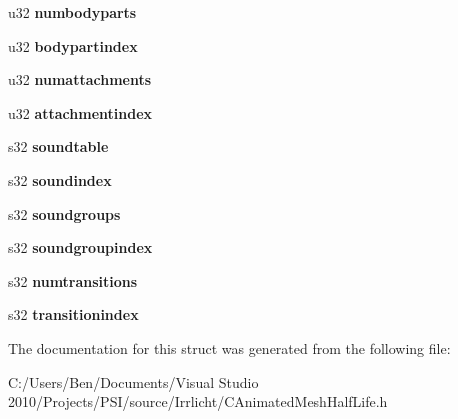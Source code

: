 \begin{DoxyCompactItemize}
\item 
\hypertarget{structirr_1_1scene_1_1_s_halflife_header_adc601bd49e466d5c3c8777052e76330c}{u32 {\bfseries numbodyparts}}\label{structirr_1_1scene_1_1_s_halflife_header_adc601bd49e466d5c3c8777052e76330c}

\item 
\hypertarget{structirr_1_1scene_1_1_s_halflife_header_a88eb3829852467da468837aaaaefb270}{u32 {\bfseries bodypartindex}}\label{structirr_1_1scene_1_1_s_halflife_header_a88eb3829852467da468837aaaaefb270}

\item 
\hypertarget{structirr_1_1scene_1_1_s_halflife_header_a84d60bec2538ec08927b6fa04aaa826a}{u32 {\bfseries numattachments}}\label{structirr_1_1scene_1_1_s_halflife_header_a84d60bec2538ec08927b6fa04aaa826a}

\item 
\hypertarget{structirr_1_1scene_1_1_s_halflife_header_af08bd79b798ce52c4fd05bdd84846a96}{u32 {\bfseries attachmentindex}}\label{structirr_1_1scene_1_1_s_halflife_header_af08bd79b798ce52c4fd05bdd84846a96}

\item 
\hypertarget{structirr_1_1scene_1_1_s_halflife_header_ae712417aa339a95d5b986df93385f402}{s32 {\bfseries soundtable}}\label{structirr_1_1scene_1_1_s_halflife_header_ae712417aa339a95d5b986df93385f402}

\item 
\hypertarget{structirr_1_1scene_1_1_s_halflife_header_a9eed75cf3727732dfa6db2b24ceb291d}{s32 {\bfseries soundindex}}\label{structirr_1_1scene_1_1_s_halflife_header_a9eed75cf3727732dfa6db2b24ceb291d}

\item 
\hypertarget{structirr_1_1scene_1_1_s_halflife_header_abaf2323d411d43c091816a8a5a32cd2c}{s32 {\bfseries soundgroups}}\label{structirr_1_1scene_1_1_s_halflife_header_abaf2323d411d43c091816a8a5a32cd2c}

\item 
\hypertarget{structirr_1_1scene_1_1_s_halflife_header_a36a1d08c2ddfd2ec15a3551a62e5c362}{s32 {\bfseries soundgroupindex}}\label{structirr_1_1scene_1_1_s_halflife_header_a36a1d08c2ddfd2ec15a3551a62e5c362}

\item 
\hypertarget{structirr_1_1scene_1_1_s_halflife_header_ad0c84689cd3b4b808fd2418a5f29c71b}{s32 {\bfseries numtransitions}}\label{structirr_1_1scene_1_1_s_halflife_header_ad0c84689cd3b4b808fd2418a5f29c71b}

\item 
\hypertarget{structirr_1_1scene_1_1_s_halflife_header_aab26007fafda4f34980243c38f32e5d7}{s32 {\bfseries transitionindex}}\label{structirr_1_1scene_1_1_s_halflife_header_aab26007fafda4f34980243c38f32e5d7}

\end{DoxyCompactItemize}


The documentation for this struct was generated from the following file\-:\begin{DoxyCompactItemize}
\item 
C\-:/\-Users/\-Ben/\-Documents/\-Visual Studio 2010/\-Projects/\-P\-S\-I/source/\-Irrlicht/C\-Animated\-Mesh\-Half\-Life.\-h\end{DoxyCompactItemize}
